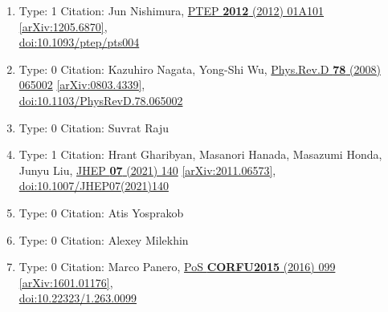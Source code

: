 \documentclass[a4paper,10pt]{article}
\begin{document}
\begin{enumerate}
\begin{enumerate}
  \item Type: 1 Citation: Jun Nishimura, \href{https://www.doi.org/10.1093/ptep/pts004}{PTEP {\bf 2012} (2012) 01A101}  \href{https://arxiv.org/abs/1205.6870}{[arXiv:1205.6870]},\\\href{https://www.doi.org/10.1093/ptep/pts004}{doi:10.1093/ptep/pts004}
  \item Type: 0 Citation: Kazuhiro Nagata, Yong-Shi Wu, \href{https://www.doi.org/10.1103/PhysRevD.78.065002}{Phys.Rev.D {\bf 78} (2008) 065002}  \href{https://arxiv.org/abs/0803.4339}{[arXiv:0803.4339]},\\\href{https://www.doi.org/10.1103/PhysRevD.78.065002}{doi:10.1103/PhysRevD.78.065002}
  \item Type: 0 Citation: Suvrat Raju
  \item Type: 1 Citation: Hrant Gharibyan, Masanori Hanada, Masazumi Honda, Junyu Liu, \href{https://www.doi.org/10.1007/JHEP07(2021)140}{JHEP {\bf 07} (2021) 140}  \href{https://arxiv.org/abs/2011.06573}{[arXiv:2011.06573]},\\\href{https://www.doi.org/10.1007/JHEP07(2021)140}{doi:10.1007/JHEP07(2021)140}
  \item Type: 0 Citation: Atis Yosprakob
  \item Type: 0 Citation: Alexey Milekhin
  \item Type: 0 Citation: Marco Panero, \href{https://www.doi.org/10.22323/1.263.0099}{PoS {\bf CORFU2015} (2016) 099}  \href{https://arxiv.org/abs/1601.01176}{[arXiv:1601.01176]},\\\href{https://www.doi.org/10.22323/1.263.0099}{doi:10.22323/1.263.0099}

\end{enumerate}
\end{enumerate}
\end{document}
